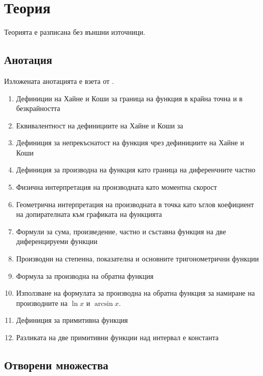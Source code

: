 \documentclass{../../common/topic}
\begin{document}
\maketitle

\section{Теория}

Теорията е разписана без външни източници.

\subsection{Анотация}

Изложената анотацията е взета от \cite{Syllabus}.

\begin{enumerate}
  \item Дефиниции на Хайне и Коши за граница на функция в крайна точна и в безкрайността
  \item Еквивалентност на дефинициите на Хайне и Коши за
  \item Дефиниция за непрекъснатост на функция чрез дефинициите на Хайне и Коши
  \item Дефиниция за производна на функция като граница на диференчните частно
  \item Физична интерпретация на производната като моментна скорост
  \item Геометрична интерпретация на производната в точка като ъглов коефициент на допирателната към графиката на функцията
  \item Формули за сума, произведение, частно и съставна функция на две диференцируеми функции
  \item Производни на степенна, показателна и основните тригонометрични функции
  \item Формула за производна на обратна функция
  \item Използване на формулата за производна на обратна функция за намиране на производните на \( \ln x \) и \( \arcsin x \).
  \item Дефиниция за примитивна функция
  \item Разликата на две примитивни функции над интервал е константа
\end{enumerate}

\subsection{Отворени множества}
\end{document}
